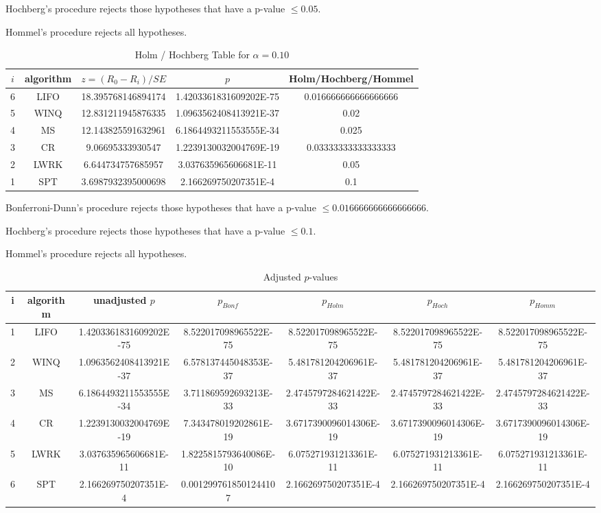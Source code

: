 \documentclass[a3paper,10pt]{article}
\begin{document}
Hochberg's procedure rejects those hypotheses that have a p-value $\le0.05$.


Hommel's procedure rejects all hypotheses.


\begin{table}[!htp]
\centering\tiny
\caption{Holm / Hochberg Table for $\alpha=0.10$}
\begin{tabular}{ccccc}
$i$&algorithm&$z=(R_0 - R_i)/SE$&$p$&Holm/Hochberg/Hommel\\
\hline
6&LIFO&18.395768146894174&1.4203361831609202E-75&0.016666666666666666\\
5&WINQ&12.831211945876335&1.0963562408413921E-37&0.02\\
4&MS&12.143825591632961&6.1864493211553555E-34&0.025\\
3&CR&9.06695333930547&1.2239130032004769E-19&0.03333333333333333\\
2&LWRK&6.644734757685957&3.037635965606681E-11&0.05\\
1&SPT&3.6987932395000698&2.166269750207351E-4&0.1\\
\hline
\end{tabular}
\end{table}
Bonferroni-Dunn's procedure rejects those hypotheses that have a p-value $\le0.016666666666666666$.


Hochberg's procedure rejects those hypotheses that have a p-value $\le0.1$.


Hommel's procedure rejects all hypotheses.


\begin{table}[!htp]
\centering\tiny
\caption{Adjusted $p$-values}
\begin{tabular}{ccccccc}
i&algorithm&unadjusted $p$&$p_{Bonf}$&$p_{Holm}$&$p_{Hoch}$&$p_{Homm}$\\
\hline
1&LIFO&1.4203361831609202E-75&8.522017098965522E-75&8.522017098965522E-75&8.522017098965522E-75&8.522017098965522E-75\\
2&WINQ&1.0963562408413921E-37&6.578137445048353E-37&5.481781204206961E-37&5.481781204206961E-37&5.481781204206961E-37\\
3&MS&6.1864493211553555E-34&3.711869592693213E-33&2.4745797284621422E-33&2.4745797284621422E-33&2.4745797284621422E-33\\
4&CR&1.2239130032004769E-19&7.343478019202861E-19&3.6717390096014306E-19&3.6717390096014306E-19&3.6717390096014306E-19\\
5&LWRK&3.037635965606681E-11&1.8225815793640086E-10&6.075271931213361E-11&6.075271931213361E-11&6.075271931213361E-11\\
6&SPT&2.166269750207351E-4&0.0012997618501244107&2.166269750207351E-4&2.166269750207351E-4&2.166269750207351E-4\\
\hline
\end{tabular}
\end{table}
\end{document}
